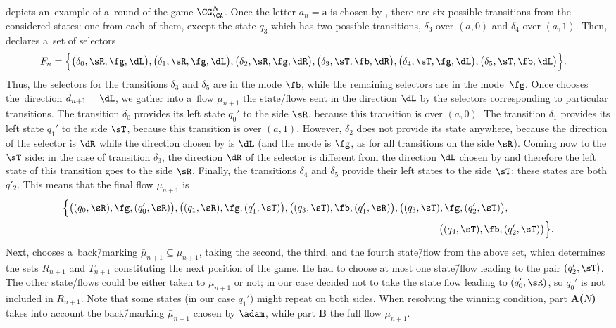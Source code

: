 \documentclass{lmcs}
\numberwithin{equation}{section}
\numberwithin{figure}{section}
\newcommand{\itemfont}[1]{\textbf{#1}}
\begin{document}
 depicts an~example of a~round of the game $\CG^N_\CA$.
Once the letter $a_n=\mathsf{a}$ is chosen by \eve, there are six possible transitions from the considered states:
one from each of them, except the state $q_3$ which has two possible transitions, $\delta_3$ over $(a,0)$ and $\delta_4$ over $(a,1)$.
Then, \eve declares a~set of selectors
\begin{align*}
	F_n=\Big\{&\big(\delta_0,\sR,\fg,\dL\big),\big(\delta_1,\sR,\fg,\dL\big),\big(\delta_2,\sR,\fg,\dR\big),
	\big(\delta_3,\sT,\fb,\dR\big),\big(\delta_4,\sT,\fg,\dL\big),\big(\delta_5,\sT,\fb,\dL\big)\Big\}.
\end{align*}
Thus, the selectors for the transitions $\delta_3$ and $\delta_5$ are in the mode $\fb$, while the remaining selectors are in the mode~$\fg$.
Once \adam chooses the~direction $d_{n+1}=\dL$, we gather into a~flow $\mu_{n+1}$ the state\=/flows sent in the direction $\dL$ by the selectors corresponding to particular transitions.
The transition $\delta_0$ provides its left state $q_0'$ to the side $\sR$, because this transition is over $(a,0)$.
The transition $\delta_1$ provides its left state $q_1'$ to the side $\sT$, because this transition is over $(a,1)$.
However, $\delta_2$ does not provide its state anywhere, because the direction of the selector is $\dR$ while the direction chosen by \adam is $\dL$ (and the mode is $\fg$, as for all transitions on the side $\sR$).
Coming now to the $\sT$ side: in the case of transition $\delta_3$, the direction $\dR$ of the selector is different from the direction $\dL$ chosen by \adam and therefore the left state of this transition goes to the side $\sR$.
Finally, the transitions $\delta_4$ and $\delta_5$ provide their left states to the side $\sT$; these states are both $q'_2$.
This means that the final flow $\mu_{n+1}$ is
\begin{align*}
	\Big\{\big((q_0,\sR),\fg,(q'_0,\sR)\big),\big((q_1,\sR),\fg,(q'_1,\sT)\big),\big((q_3,\sT),\fb,(q'_1,\sR)\big),\big((q_3,\sT),\fg,(q'_2,\sT)\big),&\\
	&\hspace{-7em}\big((q_4,\sT),\fb,(q'_2,\sT)\big)\Big\}.
\end{align*}
Next, \adam chooses a~back\=/marking $\bar\mu_{n+1}\subseteq\mu_{n+1}$, taking the second, the third, and the fourth state\=/flow from the above set,
which determines the sets $R_{n+1}$ and $T_{n+1}$ constituting the next position of the game.
He had to choose at most one state\=/flow leading to the pair $(q'_2,\sT)$.
The other state\=/flows could be either taken to $\bar\mu_{n+1}$ or not;
in our case \adam decided not to take the state flow leading to $(q'_0,\sR)$, so $q_0'$ is not included in $R_{n+1}$.
Note that some states (in our case $q_1'$) might repeat on both sides.
When resolving the winning condition, part \itemfont{A($N$)} takes into account the back\=/marking $\bar\mu_{n+1}$ chosen by $\adam$, while part \itemfont{B} the full flow $\mu_{n+1}$.
\end{document}
